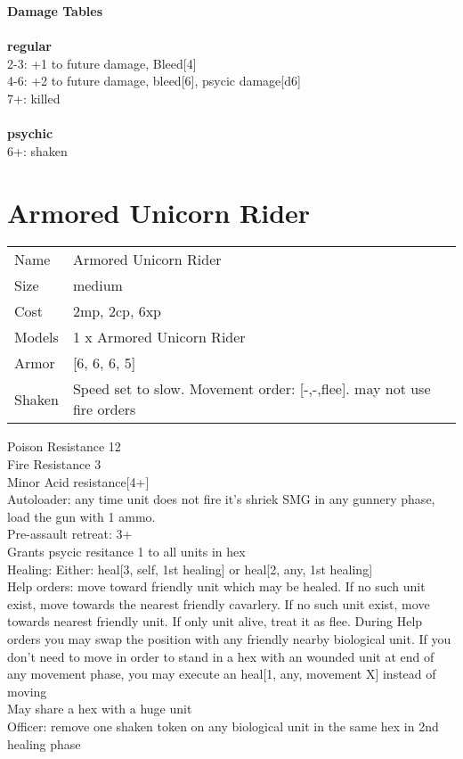 {\bf Damage Tables} \\
\ \\ {\bf regular } \\
2-3: +1 to future damage, Bleed[4] \\
4-6: +2 to future damage, bleed[6], psycic damage[d6] \\
7+: killed \\
\ \\ {\bf psychic } \\
6+: shaken \\










\pagebreak\pagebreak

\section{ Armored Unicorn Rider }

\begin{tabular}{ll}
  Name & Armored Unicorn Rider \\
  Size & medium\\
  Cost & 2mp, 2cp, 6xp\\
  Models & 1 x Armored Unicorn Rider\\
  Armor & [6, 6, 6, 5]\\
  Shaken & Speed set to slow. Movement order: [-,-,flee]. may not use fire orders\\
\end{tabular}

\noindent Poison Resistance 12\\ 
Fire Resistance 3\\ 
Minor Acid resistance[4+]\\ 
Autoloader: any time unit does not fire it's shriek SMG in any gunnery phase, load the gun with 1 ammo.\\ 
Pre-assault retreat: 3+\\ 
Grants psycic resitance 1 to all units in hex\\ 
Healing: Either: heal[3, self, 1st healing] or heal[2, any, 1st healing]\\ 
Help orders: move toward friendly unit which may be healed. If no such unit exist, move towards the nearest friendly cavarlery. If no such unit exist, move towards nearest friendly unit. If only unit alive, treat it as flee. During Help orders you may swap the position with any friendly nearby biological unit. If you don't need to move in order to stand in a hex with an wounded unit at end of any movement phase, you may execute an heal[1, any, movement X] instead of moving\\ 
May share a hex with a huge unit\\ 
Officer: remove one shaken token on any biological unit in the same hex in 2nd healing  phase\\ 


